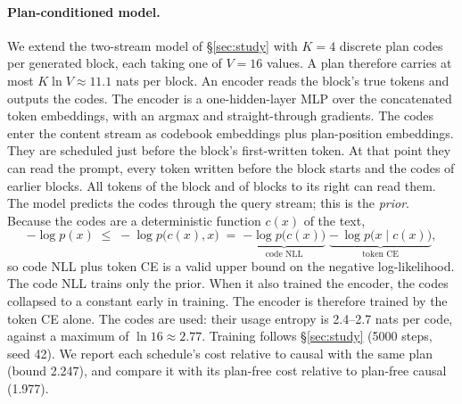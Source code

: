 \documentclass[11pt]{article}
\theoremstyle{definition}
\theoremstyle{remark}
\newcommand{\sch}[1]{\textsf{#1}}
\begin{document}
\paragraph{Plan-conditioned model.}
We extend the two-stream model of \S\ref{sec:study} with $K=4$ discrete plan codes per generated block, each taking one of $V=16$ values.
A plan therefore carries at most $K\ln V\approx11.1$ nats per block.
An encoder reads the block's true tokens and outputs the codes.
The encoder is a one-hidden-layer MLP over the concatenated token embeddings, with an argmax and straight-through gradients.
The codes enter the content stream as codebook embeddings plus plan-position embeddings.
They are scheduled just before the block's first-written token.
At that point they can read the prompt, every token written before the block starts and the codes of earlier blocks.
All tokens of the block and of blocks to its right can read them.
The model predicts the codes through the query stream; this is the \emph{prior}.
Because the codes are a deterministic function $c(x)$ of the text,
\begin{equation}
  -\log p(x)\;\le\;-\log p\big(c(x),x\big)\;=\;\underbrace{-\log p\big(c(x)\big)}_{\text{code NLL}}\;\underbrace{-\,\log p\big(x\mid c(x)\big)}_{\text{token CE}},
  \label{eq:planbound}
\end{equation}
so code NLL plus token CE is a valid upper bound on the negative log-likelihood.
The code NLL trains only the prior.
When it also trained the encoder, the codes collapsed to a constant early in training.
The encoder is therefore trained by the token CE alone.
The codes are used: their usage entropy is 2.4--2.7 nats per code, against a maximum of $\ln16\approx2.77$.
Training follows \S\ref{sec:study} (5000 steps, seed 42).
We report each schedule's cost relative to \sch{causal} with the same plan (bound 2.247), and compare it with its plan-free cost relative to plan-free \sch{causal} (1.977).
\end{document}
